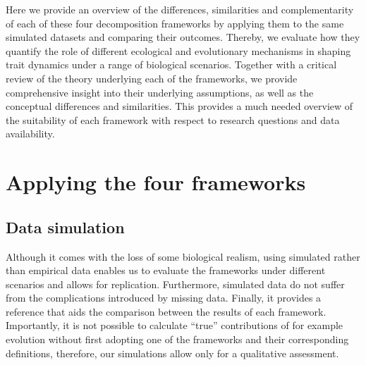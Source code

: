 Here we provide an overview of the differences, similarities and complementarity of each of these four decomposition frameworks by applying them to the same simulated datasets and comparing their outcomes. Thereby, we evaluate how they quantify the role of different ecological and evolutionary mechanisms in shaping trait dynamics under a range of biological scenarios. Together with a critical review of the theory underlying each of the frameworks, we provide comprehensive insight into their underlying assumptions, as well as the conceptual differences and similarities. This provides a much needed overview of the suitability of each framework with respect to research questions and data availability.


\section{Applying the four frameworks}


\subsection{Data simulation}

Although it comes with the loss of some biological realism, using simulated rather than empirical data enables us to evaluate the frameworks under different scenarios and allows for replication. Furthermore, simulated data do not suffer from the complications introduced by missing data. Finally, it provides a reference that aids the comparison between the results of each framework. Importantly, it is not possible to calculate ``true'' contributions of for example evolution without first adopting one of the frameworks and their corresponding definitions, therefore, our simulations allow only for a qualitative assessment. 

